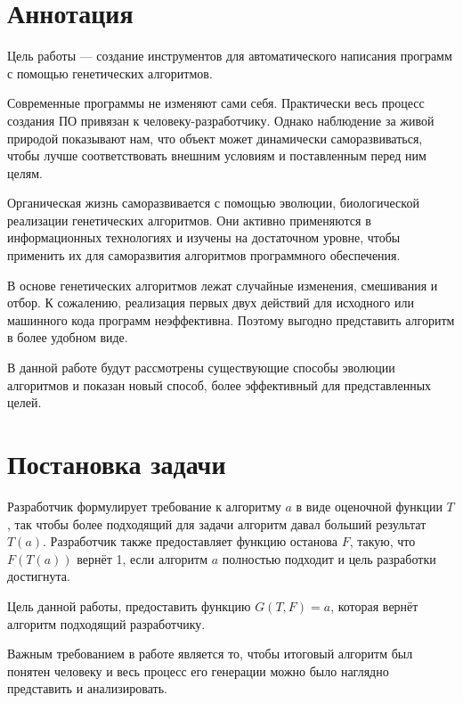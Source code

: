 \documentclass[a4paper,14pt]{extarticle}
\begin{document}
\section*{Аннотация}

Цель работы — создание инструментов для автоматического написания программ с
помощью генетических алгоритмов.

Современные программы не изменяют сами себя. Практически весь процесс создания
ПО привязан к человеку-разработчику. Однако наблюдение за живой природой
показывают нам, что объект может динамически саморазвиваться, чтобы лучше
соответствовать внешним условиям и поставленным перед ним целям.

Органическая жизнь саморазвивается с помощью эволюции, биологической реализации
генетических алгоритмов. Они активно применяются в информационных технологиях и
изучены на достаточном уровне, чтобы применить их для саморазвития алгоритмов
программного обеспечения.

В основе генетических алгоритмов лежат случайные изменения, смешивания и отбор.
К сожалению, реализация первых двух действий для исходного или машинного кода 
программ неэффективна. Поэтому выгодно представить алгоритм в более удобном
виде.

В данной работе будут рассмотрены существующие способы эволюции алгоритмов и
показан новый способ, более эффективный для представленных целей.

\newpage
\tableofcontents

\newpage
\section{Постановка задачи}
Разработчик формулирует требование к алгоритму $a$ в виде оценочной
функции $T$, так чтобы более подходящий для задачи алгоритм давал больший
результат $T(a)$. Разработчик также предоставляет функцию останова $F$, такую,
что $F(T(a))$ вернёт 1, если алгоритм $a$ полностью подходит и цель разработки
достигнута.

Цель данной работы, предоставить функцию $G(T, F) = a$, которая вернёт алгоритм подходящий разработчику.

Важным требованием в работе является то, чтобы итоговый алгоритм был понятен
человеку и весь процесс его генерации можно было наглядно представить и
анализировать.
\end{document}
